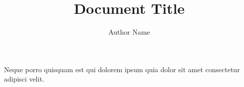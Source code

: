 \documentclass[12pt]{article}
\title{Document Title}
\author{Author Name}
\date{}
\begin{document}
\maketitle

Neque porro quisquam est qui dolorem ipsum quia dolor sit amet consectetur
adipisci velit.
\end{document}
